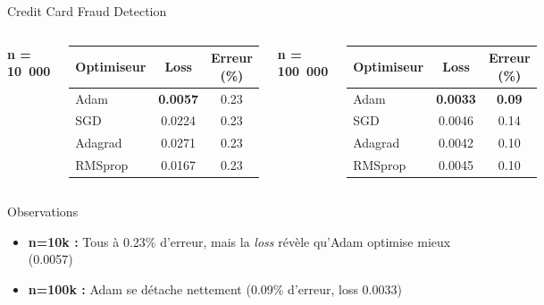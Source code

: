 \documentclass{beamer}
\begin{document}
\begin{frame}{Credit Card Fraud Detection}

\begin{columns}[T]

\begin{center}
\textbf{n = 10~000}
\end{center}
\vspace{-0.7cm}
\begin{center}
\footnotesize
\begin{tabular}{|l|c|c|}
\hline
\textbf{Optimiseur} & \textbf{Loss} & \textbf{Erreur (\%)} \\
\hline
Adam & \textcolor{mygreen}{\textbf{0.0057}} & 0.23 \\
SGD & 0.0224 & 0.23 \\
Adagrad & 0.0271 & 0.23 \\
RMSprop & 0.0167 & 0.23 \\
\hline
\end{tabular}
\end{center}

\begin{center}
\textbf{n = 100~000}
\end{center}
\vspace{-0.7cm}
\begin{center}
\footnotesize
\begin{tabular}{|l|c|c|}
\hline
\textbf{Optimiseur} & \textbf{Loss} & \textbf{Erreur (\%)} \\
\hline
Adam & \textcolor{mygreen}{\textbf{0.0033}} & \textcolor{mygreen}{\textbf{0.09}} \\
SGD & 0.0046 & 0.14 \\
Adagrad & 0.0042 & 0.10 \\
RMSprop & 0.0045 & 0.10 \\
\hline
\end{tabular}
\end{center}

\end{columns}

\vspace{0.2cm} 
\begin{block}{Observations}
\begin{itemize}
  \item \textbf{n=10k :} Tous à 0.23\% d'erreur, mais la \textit{loss} révèle qu'Adam optimise mieux (0.0057)
  \item \textbf{n=100k :} Adam se détache nettement (0.09\% d'erreur, loss 0.0033)
\end{itemize}
\end{block}

\end{frame}
\end{document}
